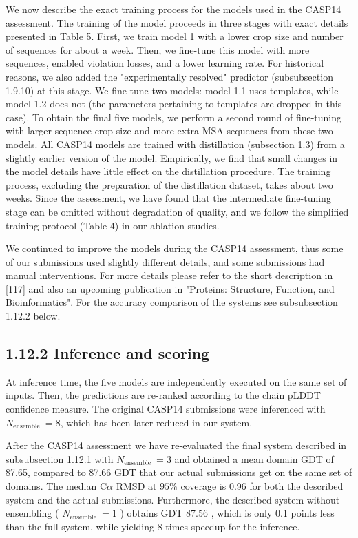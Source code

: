 \documentclass[10pt]{article}
\begin{document}
We now describe the exact training process for the models used in the CASP14 assessment. The training of the model proceeds in three stages with exact details presented in Table 5. First, we train model 1 with a lower crop size and number of sequences for about a week. Then, we fine-tune this model with more sequences, enabled violation losses, and a lower learning rate. For historical reasons, we also added the "experimentally resolved" predictor (subsubsection 1.9.10) at this stage. We fine-tune two models: model 1.1 uses templates, while model 1.2 does not (the parameters pertaining to templates are dropped in this case). To obtain the final five models, we perform a second round of fine-tuning with larger sequence crop size and more extra MSA sequences from these two models. All CASP14 models are trained with distillation (subsection 1.3) from a slightly earlier version of the model. Empirically, we find that small changes in the model details have little effect on the distillation procedure. The training process, excluding the preparation of the distillation dataset, takes about two weeks. Since the assessment, we have found that the intermediate fine-tuning stage can be omitted without degradation of quality, and we follow the simplified training protocol (Table 4) in our ablation studies.

We continued to improve the models during the CASP14 assessment, thus some of our submissions used slightly different details, and some submissions had manual interventions. For more details please refer to the short description in [117] and also an upcoming publication in "Proteins: Structure, Function, and Bioinformatics". For the accuracy comparison of the systems see subsubsection 1.12.2 below.

\subsection*{1.12.2 Inference and scoring}
At inference time, the five models are independently executed on the same set of inputs. Then, the predictions are re-ranked according to the chain pLDDT confidence measure. The original CASP14 submissions were inferenced with $N_{\text {ensemble }}=8$, which has been later reduced in our system.

After the CASP14 assessment we have re-evaluated the final system described in subsubsection 1.12.1 with $N_{\text {ensemble }}=3$ and obtained a mean domain GDT of 87.65, compared to 87.66 GDT that our actual submissions get on the same set of domains. The median $\mathrm{C} \alpha$ RMSD at $95 \%$ coverage is 0.96 for both the described system and the actual submissions. Furthermore, the described system without ensembling ( $N_{\text {ensemble }}=1$ ) obtains GDT 87.56 , which is only 0.1 points less than the full system, while yielding 8 times speedup for the inference.
\end{document}
